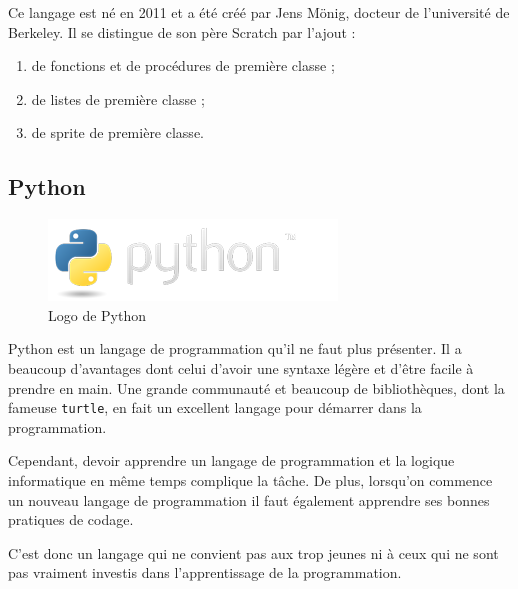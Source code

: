 Ce langage est né en 2011 et a été créé par Jens Mönig, docteur de l'université de Berkeley. Il se distingue de son père Scratch par l'ajout :
\begin{enumerate}
\item de fonctions et de procédures de première classe ;
\item de listes de première classe ;
\item de sprite de première classe.
\end{enumerate}

\subsection{Python}
\begin{figure}[!h]
  \begin{center}
    \includegraphics[scale=0.4]{content/5-related_work/images/python}
    \caption{Logo de Python}
    \label{fig:python}
  \end{center}
\end{figure}
Python est un langage de programmation qu'il ne faut plus présenter. Il a beaucoup d'avantages dont celui d'avoir une syntaxe légère et d'être facile à prendre en main. Une grande communauté et beaucoup de bibliothèques, dont la fameuse \texttt{turtle}, en fait un excellent langage pour démarrer dans la programmation.

Cependant, devoir apprendre un langage de programmation et la logique informatique en même temps complique la tâche. De plus, lorsqu'on commence un nouveau langage de programmation il faut également apprendre ses bonnes pratiques de codage.

C'est donc un langage qui ne convient pas aux trop jeunes ni à ceux qui ne sont pas vraiment investis dans l'apprentissage de la programmation.
